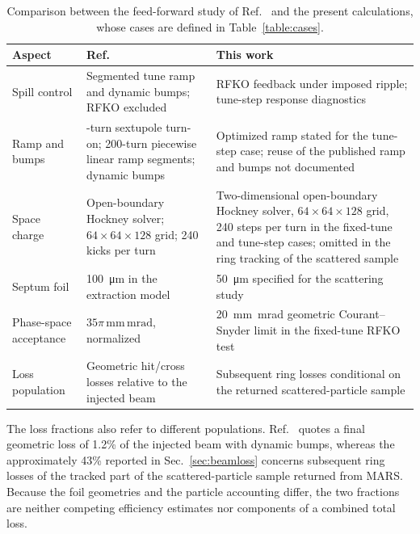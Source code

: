 \documentclass[a4paper,fleqn]{cas-sc}
\begin{document}
\begin{table}[width=\linewidth,cols=3,pos=tbp]
  \caption{\label{table:scope}Comparison between the feed-forward study of Ref.~\cite{mu2e} and the present calculations, whose cases are defined in Table~\ref{table:cases}.}
  \renewcommand{\arraystretch}{1.2}
  \begin{tabular}{@{}>{\raggedright\arraybackslash}p{.18\linewidth}>{\raggedright\arraybackslash}p{.36\linewidth}>{\raggedright\arraybackslash}p{.38\linewidth}@{}}
    \toprule
    Aspect & Ref.~\cite{mu2e} & This work \\
    \midrule
    Spill control & Segmented tune ramp and dynamic bumps; RFKO excluded & RFKO feedback under imposed ripple; tune-step response diagnostics \\
    Ramp and bumps & 100-turn sextupole turn-on; 200-turn piecewise linear ramp segments; dynamic bumps & Optimized ramp stated for the tune-step case; reuse of the published ramp and bumps not documented \\
    Space charge & Open-boundary Hockney solver; $64\times64\times128$ grid; 240 kicks per turn & Two-dimensional open-boundary Hockney solver, $64\times64\times128$ grid, 240 steps per turn in the fixed-tune and tune-step cases; omitted in the ring tracking of the scattered sample \\
    Septum foil & \SI{100}{\micro\metre} in the extraction model & \SI{50}{\micro\metre} specified for the scattering study \\
    Phase-space acceptance & $35\pi\,\mathrm{mm\,mrad}$, normalized & \SI{20}{\milli\metre\milli\radian} geometric Courant--Snyder limit in the fixed-tune RFKO test \\
    Loss population & Geometric hit/cross losses relative to the injected beam & Subsequent ring losses conditional on the returned scattered-particle sample \\
    \bottomrule
  \end{tabular}
\end{table}

The loss fractions also refer to different populations. Ref.~\cite{mu2e} quotes a final geometric loss of 1.2\% of the injected beam with dynamic bumps, whereas the approximately 43\% reported in Sec.~\ref{sec:beamloss} concerns subsequent ring losses of the tracked part of the scattered-particle sample returned from MARS. Because the foil geometries and the particle accounting differ, the two fractions are neither competing efficiency estimates nor components of a combined total loss.
\end{document}
